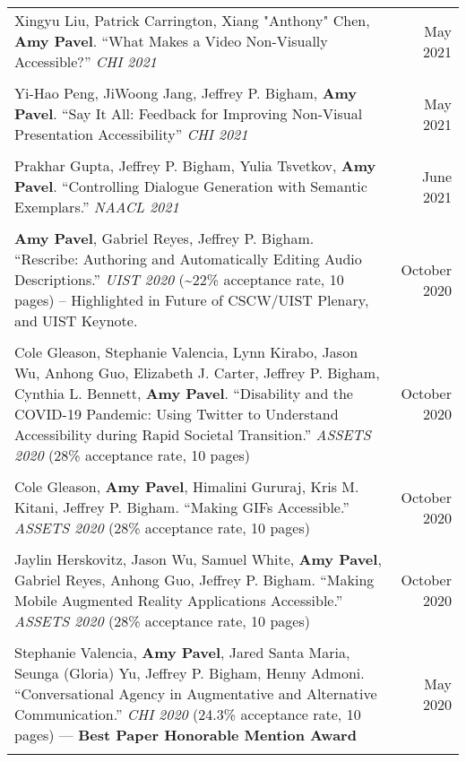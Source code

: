 \begin{longtable}{Xr}
	Xingyu Liu, Patrick Carrington, Xiang "Anthony" Chen, \textbf{Amy Pavel}. ``What Makes a Video Non-Visually Accessible?'' \textit{CHI 2021} & May 2021 \\
	\\

	Yi-Hao Peng, JiWoong Jang, Jeffrey P. Bigham, \textbf{Amy Pavel}. ``Say It All: Feedback for Improving Non-Visual Presentation Accessibility'' \textit{CHI 2021} & May 2021 \\
	\\

	Prakhar Gupta, Jeffrey P. Bigham, Yulia Tsvetkov, \textbf{Amy Pavel}. ``Controlling Dialogue Generation with Semantic Exemplars.'' \textit{NAACL 2021} & June 2021 \\
	\\

	\textbf{Amy Pavel}, Gabriel Reyes, Jeffrey P. Bigham. ``Rescribe: Authoring and Automatically Editing Audio Descriptions.'' \textit{UIST 2020} (\textasciitilde22\% acceptance rate, 10 pages) -- Highlighted in Future of CSCW/UIST Plenary, and UIST Keynote. & October 2020 \\
	\\

	Cole Gleason, Stephanie Valencia, Lynn Kirabo, Jason Wu, Anhong Guo, Elizabeth J. Carter, Jeffrey P. Bigham, Cynthia L. Bennett, \textbf{Amy Pavel}. ``Disability and the COVID-19 Pandemic: Using Twitter to Understand Accessibility during Rapid Societal Transition.'' \textit{ASSETS 2020} (28\% acceptance rate, 10 pages) & October 2020 \\
	\\

	Cole Gleason, \textbf{Amy Pavel}, Himalini Gururaj, Kris M. Kitani, Jeffrey P. Bigham. ``Making GIFs Accessible.'' \textit{ASSETS 2020} (28\% acceptance rate, 10 pages) & October 2020 \\
	\\

	Jaylin Herskovitz, Jason Wu, Samuel White, \textbf{Amy Pavel}, Gabriel Reyes, Anhong Guo, Jeffrey P. Bigham. ``Making Mobile Augmented Reality Applications Accessible.'' \textit{ASSETS 2020} (28\% acceptance rate, 10 pages) & October 2020 \\
	\\

	Stephanie Valencia, \textbf{Amy Pavel}, Jared Santa Maria, Seunga (Gloria) Yu, Jeffrey P. Bigham, Henny Admoni. ``Conversational Agency in Augmentative and Alternative Communication.'' \textit{CHI 2020} (24.3\% acceptance rate, 10 pages) --- \textbf{Best Paper Honorable Mention Award} & May 2020 \\
	\\


\end{longtable}
